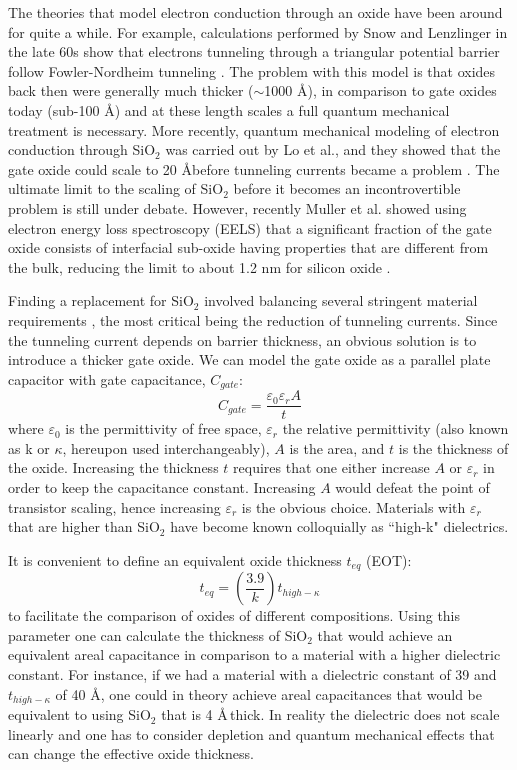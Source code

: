 The theories that model electron conduction through an oxide have been around for quite a while. For example, calculations performed by Snow and Lenzlinger in the late 60s show that electrons tunneling through a triangular potential barrier follow Fowler-Nordheim tunneling \cite{Lenzlinger1969}. The problem with this model is that oxides back then were generally much thicker ($\sim$1000 \AA), in comparison to gate oxides today (sub-100 \AA) and at these length scales a full quantum mechanical treatment is necessary. More recently, quantum mechanical modeling of electron conduction through SiO$_{2}$ was carried out by Lo et al., and they showed that the gate oxide could scale to 20 \AA\;before tunneling currents became a problem \cite{Lo1997}. The ultimate limit to the scaling of SiO$_2$ before it becomes an incontrovertible problem is still under debate. However, recently Muller et al. showed using electron energy loss spectroscopy (EELS) that a significant fraction of the gate oxide consists of interfacial sub-oxide having properties that are different from the bulk, reducing the limit to about 1.2 nm for silicon oxide \cite{Muller1999}.

Finding a replacement for SiO$_{2}$ involved balancing several stringent material requirements \cite{Wilk2001,Robertson2006}, the most critical being the reduction of tunneling currents. Since the tunneling current depends on barrier thickness, an obvious solution is to introduce a thicker gate oxide. We can model the gate oxide as a parallel plate capacitor with gate capacitance, $C_{gate}$:
\begin{equation}\label{eq:gateC}
C_{gate} = \frac{\varepsilon_{0}\varepsilon_{r}A}{t}
\end{equation}
where $\varepsilon_{0}$ is the permittivity of free space, $\varepsilon_{r}$ the relative permittivity (also known as k or $\kappa$, hereupon used interchangeably), $A$ is the area, and $t$ is the thickness of the oxide. Increasing the thickness $t$ requires that one either increase $A$ or $\varepsilon_{r}$ in order to keep the capacitance constant. Increasing $A$ would defeat the point of transistor scaling, hence increasing $\varepsilon_{r}$ is the obvious choice. Materials with $\varepsilon_{r}$ that are higher than SiO$_{2}$ have become known colloquially as ``high-k" dielectrics. 

It is convenient to define an equivalent oxide thickness $t_{eq}$ (EOT):
\begin{equation}\label{eq:teq}
t_{eq} = \left(\frac{3.9}{k}\right) t_{high-\kappa}
\end{equation} 
to facilitate the comparison of oxides of different compositions. Using this parameter one can calculate the thickness of SiO$_{2}$ that would achieve an equivalent areal capacitance in comparison to a material with a higher dielectric constant. For instance, if we had a material with a dielectric constant of 39 and $t_{high-\kappa}$ of 40 \AA, one could in theory achieve areal capacitances that would be equivalent to using SiO$_{2}$ that is 4 \AA\,thick. In reality the dielectric does not scale linearly and one has to consider depletion and quantum mechanical effects that can change the effective oxide thickness. 

